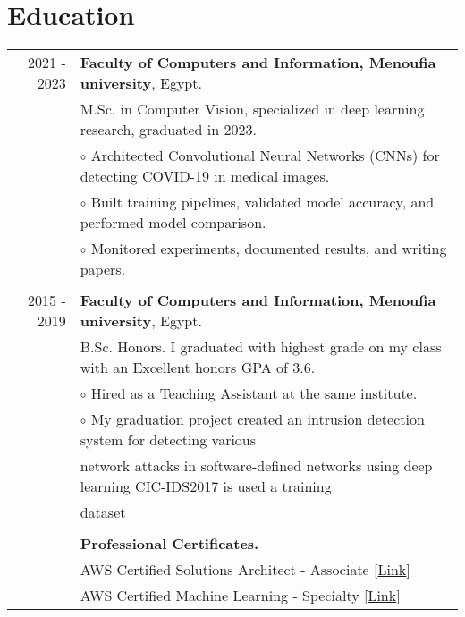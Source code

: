 \documentclass[a4paper,10pt]{article}
\begin{document}
\section{\textbf{Education}}
\begin{tabular}{r|l}
    2021 - 2023  & \textbf{Faculty of Computers and Information, Menoufia university}, Egypt.\\ & M.Sc. in Computer Vision, specialized in deep learning research, graduated in 2023. \\ &
    $\circ$ Architected Convolutional Neural Networks (CNNs) for detecting COVID-19 in medical images. \\ &
    $\circ$ Built training pipelines, validated model accuracy, and performed model comparison. \\ &   
    $\circ$ Monitored experiments, documented results, and writing papers. \\
    &\\
    2015 - 2019 & \textbf{Faculty of Computers and Information, Menoufia university}, Egypt. \\ & B.Sc. Honors. I graduated with highest grade on my class with an Excellent honors GPA of 3.6. \\ &
    $\circ$ Hired as a Teaching Assistant at the same institute. \\ &
    $\circ$ My graduation project created an intrusion detection system for detecting various \\ & network attacks in software-defined networks using deep learning CIC-IDS2017 is used a training \\ & dataset\\
    &\\
    & \textbf{Professional Certificates.} \\
    & AWS Certified Solutions Architect - Associate [\href{https://cp.certmetrics.com/amazon/en/public/verify/credential/8ff7ef944a1c49cf873b541903d9cbc3}{Link}] \\
    & AWS Certified Machine Learning - Specialty [\href{https://cp.certmetrics.com/amazon/en/public/verify/credential/b5b06f594c0a45929e1971bf5215daf7}{Link}] \\
    \end{tabular}


\end{document}
